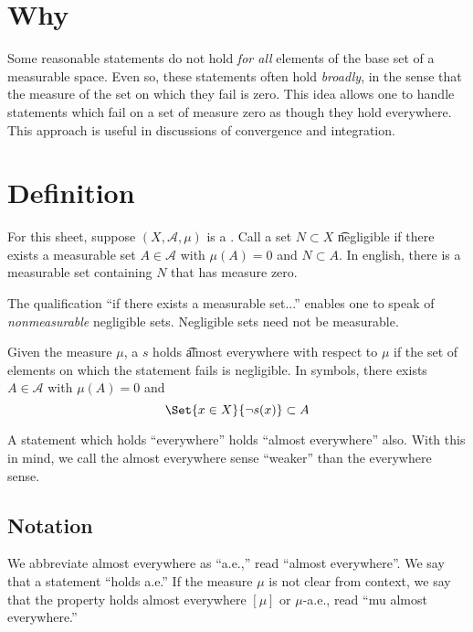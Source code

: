 

\section*{Why}

Some reasonable statements do not hold \textit{for all} elements of the base set of a measurable space.
Even so, these statements often hold \textit{broadly}, in the sense that the measure of the set on which they fail is zero.
This idea allows one to handle statements which fail on a set of measure zero as though they hold everywhere.
This approach is useful in discussions of convergence and integration.

\section*{Definition}

For this sheet, suppose $(X, \mathcal{A} , \mu )$ is a .
Call a set $N \subset X$ \t{negligible} if there exists a measurable set $A \in \mathcal{A} $ with $\mu (A) = 0$ and $N \subset A$.
In english, there is a measurable set containing $N$ that has measure zero.

The qualification ``if there exists a measurable set...'' enables one to speak of \textit{nonmeasurable} negligible sets.
Negligible sets need not be measurable.

Given the measure $\mu $, a $s$ holds \t{almost everywhere} with respect to $\mu $ if the set of elements on which the statement fails is negligible.
In symbols, there exists $A \in \mathcal{A} $ with $\mu (A) = 0$ and
\[
\Set{x \in X}{\neg s(x)} \subset A
\]

A statement which holds ``everywhere'' holds ``almost everywhere'' also.
With this in mind, we call the almost everywhere sense ``weaker'' than the everywhere sense.

\subsection*{Notation}

We abbreviate almost everywhere as ``a.e.,'' read ``almost everywhere''.
We say that a statement ``holds a.e.''
If the measure $\mu $ is not clear from context, we say that the property holds almost everywhere $[\mu ]$ or $\mu $-a.e., read ``mu almost everywhere.''

